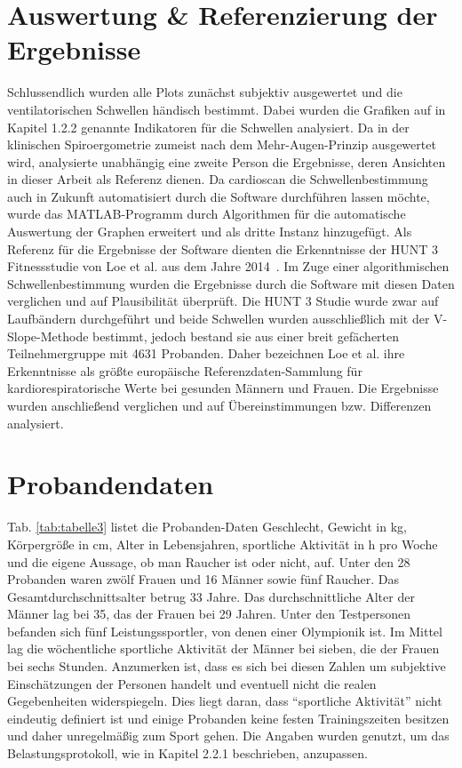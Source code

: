 \section{Auswertung \& Referenzierung der Ergebnisse}

Schlussendlich wurden alle Plots zunächst subjektiv ausgewertet und die ventilatorischen Schwellen händisch bestimmt. Dabei wurden die Grafiken auf in Kapitel 1.2.2 genannte Indikatoren für die Schwellen analysiert. Da in der klinischen Spiroergometrie zumeist nach dem Mehr-Augen-Prinzip ausgewertet wird, analysierte unabhängig eine zweite Person die Ergebnisse, deren Ansichten in dieser Arbeit als Referenz dienen. Da cardioscan die Schwellenbestimmung auch in Zukunft automatisiert durch die Software durchführen lassen möchte, wurde das MATLAB-Programm durch Algorithmen für die automatische Auswertung der Graphen erweitert und als dritte Instanz hinzugefügt. Als Referenz für die Ergebnisse der Software dienten die Erkenntnisse der HUNT 3 Fitnessstudie von Loe et al. aus dem Jahre 2014~\cite{Loe.2014}. Im Zuge einer algorithmischen Schwellenbestimmung wurden die Ergebnisse durch die Software mit diesen Daten verglichen und auf Plausibilität überprüft. Die HUNT 3 Studie wurde zwar auf Laufbändern durchgeführt und beide Schwellen wurden ausschließlich mit der V-Slope-Methode bestimmt, jedoch bestand sie aus einer breit gefächerten Teilnehmergruppe mit 4631 Probanden. Daher bezeichnen Loe et al. ihre Erkenntnisse als größte europäische Referenzdaten-Sammlung für kardiorespiratorische Werte bei gesunden Männern und Frauen. Die Ergebnisse wurden anschließend verglichen und auf Übereinstimmungen bzw. Differenzen analysiert.

\section{Probandendaten}

Tab. \ref{tab:tabelle3} listet die Probanden-Daten Geschlecht, Gewicht in \si{\kilogram}, Körpergröße in \si{\centi\metre}, Alter in Lebensjahren, sportliche Aktivität in \si{\hour} pro Woche und die eigene Aussage, ob man Raucher ist oder nicht, auf. Unter den 28 Probanden waren zwölf Frauen und 16 Männer sowie fünf Raucher. Das Gesamtdurchschnittsalter betrug 33 Jahre. Das durchschnittliche Alter der Männer lag bei 35, das der Frauen bei 29 Jahren. Unter den Testpersonen befanden sich fünf Leistungssportler, von denen einer Olympionik ist. Im Mittel lag die wöchentliche sportliche Aktivität der Männer bei sieben, die der Frauen bei sechs Stunden. Anzumerken ist, dass es sich bei diesen Zahlen um subjektive Einschätzungen der Personen handelt und eventuell nicht die realen Gegebenheiten widerspiegeln. Dies liegt daran, dass "`sportliche Aktivität"' nicht eindeutig definiert ist und einige Probanden keine festen Trainingszeiten besitzen und daher unregelmäßig zum Sport gehen. Die Angaben wurden genutzt, um das Belastungsprotokoll, wie in Kapitel 2.2.1 beschrieben, anzupassen.

